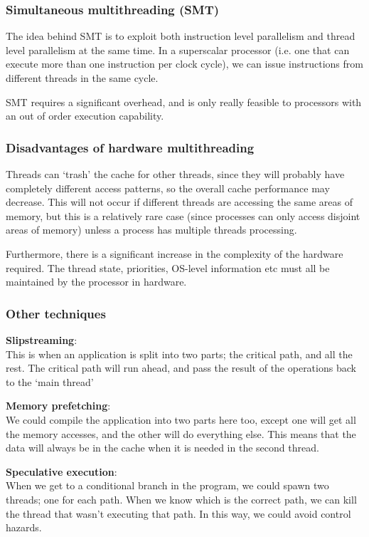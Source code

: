 \subsubsection{Simultaneous multithreading (SMT)}

The idea behind SMT is to exploit both instruction level parallelism and thread
level parallelism at the same time. In a superscalar processor (i.e. one that
can execute more than one instruction per clock cycle), we can issue
instructions from different threads in the same cycle.

SMT requires a significant overhead, and is only really feasible to processors
with an out of order execution capability.

\subsubsection{Disadvantages of hardware multithreading}

Threads can `trash' the cache for other threads, since they will probably have
completely different access patterns, so the overall cache performance may
decrease. This will not occur if different threads are accessing the same areas
of memory, but this is a relatively rare case (since processes can only access
disjoint areas of memory) unless a process has multiple threads processing.

Furthermore, there is a significant increase in the complexity of the hardware
required. The thread state, priorities, OS-level information etc must all be
maintained by the processor in hardware.

\subsubsection{Other techniques}

\begin{description}
  \item \textbf{Slipstreaming}:\\
    This is when an application is split into two parts; the critical path, and
    all the rest. The critical path will run ahead, and pass the result of the
    operations back to the `main thread'
  \item \textbf{Memory prefetching}:\\
    We could compile the application into two parts here too, except one will
    get all the memory accesses, and the other will do everything else. This
    means that the data will always be in the cache when it is needed in the 
    second thread.
  \item \textbf{Speculative execution}:\\
    When we get to a conditional branch in the program, we could spawn two
    threads; one for each path. When we know which is the correct path, we can 
    kill the thread that wasn't executing that path. In this way, we could avoid
    control hazards.
\end{description}

